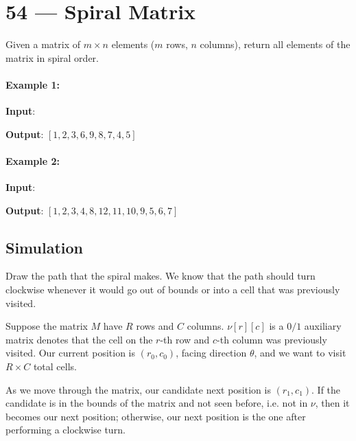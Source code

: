 \section{54 --- Spiral Matrix}
Given a matrix of $m \times n$ elements ($m$ rows, $n$ columns), return all elements of the matrix in spiral order.
\paragraph{Example 1:}
\begin{flushleft}
\textbf{Input}:
\begin{figure}[H]
\end{figure}
\par
\textbf{Output}: $[1,2,3,6,9,8,7,4,5]$
\end{flushleft}
\paragraph{Example 2:}
\begin{flushleft}
\textbf{Input}:
\par
\begin{figure}[H]
\end{figure}
\par
\textbf{Output}: $[1,2,3,4,8,12,11,10,9,5,6,7]$
\end{flushleft}

\subsection{Simulation}
Draw the path that the spiral makes. We know that the path should turn clockwise whenever it would go out of bounds or into a cell that was previously visited.
\par
Suppose the matrix $M$ have $R$ rows and $C$ columns. $\nu[r][c]$ is a $0/1$ auxiliary matrix denotes that the cell on the $r$-th row and $c$-th column was previously visited. Our current position is $(r_0, c_0)$, facing direction $\theta$, and we want to visit $R\times C$ total cells.
\par
As we move through the matrix, our candidate next position is $(r_1, c_1)$. If the candidate is in the bounds of the matrix and not seen before, i.e. not in $\nu$, then it becomes our next position; otherwise, our next position is the one after performing a clockwise turn.

